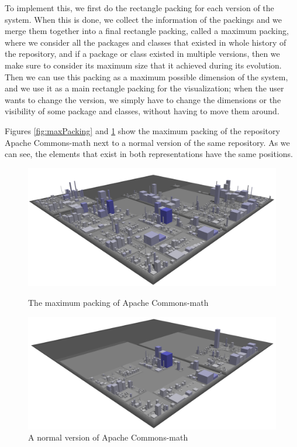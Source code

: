 \documentclass[]{usiinfbachelorproject}
\begin{document}
To implement this, we first do the rectangle packing for each version of the system. When this is done, we collect the information of the packings and we merge them together into a final rectangle packing, called a maximum packing, where we consider all the packages and classes that existed in whole history of the repository, and if a package or class existed in multiple versions, then we make sure to consider its maximum size that it achieved during its evolution.
Then we can use this packing as a maximum possible dimension of the system, and we use it as a main rectangle packing for the visualization; when the user wants to change the version, we simply have to change the dimensions or the visibility of some package and classes, without having to move them around.

Figures \ref{fig:maxPacking} and \ref{fig:maxPacking2} show the maximum packing of the repository Apache Commons-math next to a normal version of the same repository. As we can see, the elements that exist in both representations have the same positions.


\begin{figure}[H]
  \centering
  \begin{minipage}[b]{0.49\textwidth}
      \includegraphics[width=1\textwidth]{pictures/maxDrawable1.png}
      \caption{The maximum packing of Apache Commons-math}
      \label{fig:maxPacking}
  \end{minipage}
  \hfill
  \begin{minipage}[b]{0.49\textwidth}
      \includegraphics[width=1\textwidth]{pictures/maxDrawable2.png}
      \caption{A normal version of Apache Commons-math}
      \label{fig:maxPacking2}
  \end{minipage}
\end{figure}
\end{document}
